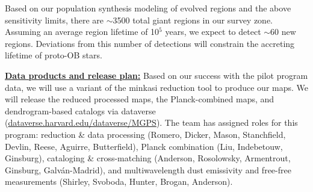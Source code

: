 \documentclass[11pt,preprint]{aastex_nofoot}
\newcommand{\MUSTANG}{\textsc{MUSTANG-2}\xspace}
\begin{document}
Based on our population synthesis modeling of evolved \hii regions and the
above sensitivity limits, there are $\sim$3500 total giant \hii
regions in our survey zone. Assuming an average \hchii region
lifetime of 10$^{5}$ years, we expect to detect $\sim$60 new \hchii
regions. Deviations from this number of detections will constrain
the accreting lifetime of proto-OB stars.


\indent\underline{\textbf{\helv Data products and release plan:}}
Based on our success with the pilot program data, we will use a variant of the
minkasi reduction tool to produce our maps.  We will release the reduced
processed maps, the Planck-combined maps, and dendrogram-based catalogs via
dataverse (\url{dataverse.harvard.edu/dataverse/MGPS}).  The team has assigned
roles for this program: reduction \& data processing (Romero, Dicker, Mason,
Stanchfield, Devlin, Reese, Aguirre, Butterfield), Planck combination (Liu,
Indebetouw, Ginsburg),  cataloging \& cross-matching (Anderson, Rosolowsky,
Armentrout, Ginsburg, Galv{\'a}n-Madrid), and multiwavelength dust emissivity
and free-free measurements (Shirley, Svoboda, Hunter, Brogan, Anderson).




\end{document}
